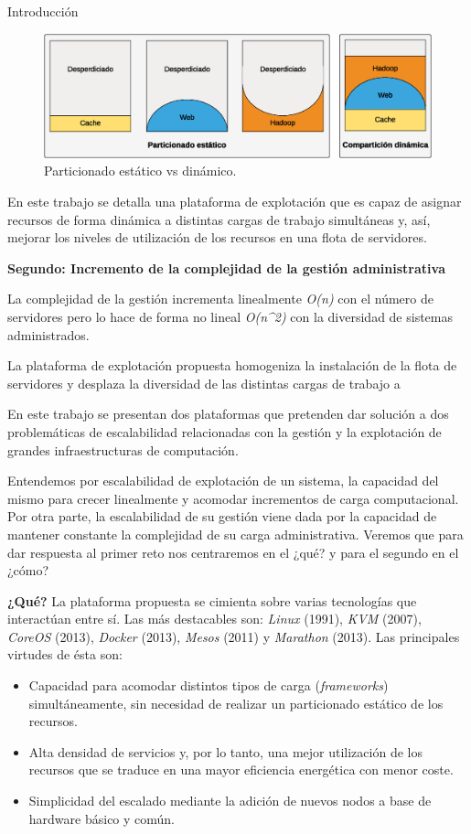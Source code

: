 \documentclass[a4paper,12pt,spanish,final]{epsc_tfc_pfc}
\begin{document}
\begin{intro}{Introducción}
\begin{figure}[h]
  \centering
  \includegraphics[scale=0.55]{static}
    \caption{Particionado estático vs dinámico.}
\end{figure}

En este trabajo se detalla una plataforma de explotación que es capaz de asignar recursos de forma dinámica a distintas cargas de trabajo simultáneas y, así, mejorar los niveles de utilización de los recursos en una flota de servidores.

\textbf{Segundo: Incremento de la complejidad de la gestión administrativa}

La complejidad de la gestión incrementa linealmente \emph{O(n)} con el número de servidores pero lo hace de forma no lineal \emph{O(n\^{}2)} con la diversidad de sistemas administrados.

La plataforma de explotación propuesta homogeniza la instalación de la flota de servidores y desplaza la diversidad de las distintas cargas de trabajo a 

En este trabajo se presentan dos plataformas que pretenden dar solución a dos problemáticas de escalabilidad relacionadas con la gestión y la explotación de grandes infraestructuras de computación.

Entendemos por escalabilidad de explotación de un sistema, la capacidad del mismo para crecer linealmente y acomodar incrementos de carga computacional. Por otra parte, la escalabilidad de su gestión viene dada por la capacidad de mantener constante la complejidad de su carga administrativa. Veremos que para dar respuesta al primer reto nos centraremos en el ¿qué? y para el segundo en el ¿cómo?

\textbf{¿Qué?} La plataforma propuesta se cimienta sobre varias tecnologías que interactúan entre sí. Las más destacables son: \emph{Linux} (1991), \emph{KVM} (2007), \emph{CoreOS} (2013), \emph{Docker} (2013), \emph{Mesos} (2011) y \emph{Marathon} (2013). Las principales virtudes de ésta son:
\begin{itemize}
  \item Capacidad para acomodar distintos tipos de carga (\emph{frameworks}) simultáneamente, sin necesidad de realizar un particionado estático de los recursos.
  \item Alta densidad de servicios y, por lo tanto, una mejor utilización de los recursos que se traduce en una mayor eficiencia energética con menor coste.
  \item Simplicidad del escalado mediante la adición de nuevos nodos a base de hardware básico y común.
\end{itemize}


\end{intro}
\end{document}
